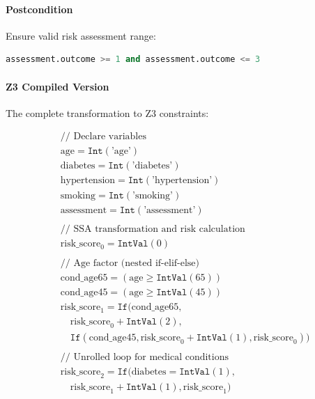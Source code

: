 \paragraph{Postcondition}
Ensure valid risk assessment range:
\begin{lstlisting}[language=Python, numbers=none]
assessment.outcome >= 1 and assessment.outcome <= 3
\end{lstlisting}

\paragraph{Z3 Compiled Version}

The complete transformation to Z3 constraints:

\begin{align*}
& \text{// Declare variables} \\
& \text{age} = \texttt{Int}(\text{'age'}) \\
& \text{diabetes} = \texttt{Int}(\text{'diabetes'}) \\
& \text{hypertension} = \texttt{Int}(\text{'hypertension'}) \\
& \text{smoking} = \texttt{Int}(\text{'smoking'}) \\
& \text{assessment} = \texttt{Int}(\text{'assessment'}) \\
\\
& \text{// SSA transformation and risk calculation} \\
& \text{risk\_score}_0 = \texttt{IntVal}(0) \\
\\
& \text{// Age factor (nested if-elif-else)} \\
& \text{cond\_age65} = (\text{age} \geq \texttt{IntVal}(65)) \\
& \text{cond\_age45} = (\text{age} \geq \texttt{IntVal}(45)) \\
& \text{risk\_score}_1 = \texttt{If}(\text{cond\_age65}, \\
& \quad \text{risk\_score}_0 + \texttt{IntVal}(2), \\
& \quad \texttt{If}(\text{cond\_age45}, \text{risk\_score}_0 + \texttt{IntVal}(1), \text{risk\_score}_0)) \\
\\
& \text{// Unrolled loop for medical conditions} \\
& \text{risk\_score}_2 = \texttt{If}(\text{diabetes} = \texttt{IntVal}(1), \\
& \quad \text{risk\_score}_1 + \texttt{IntVal}(1), \text{risk\_score}_1) \\

\end{align*}
